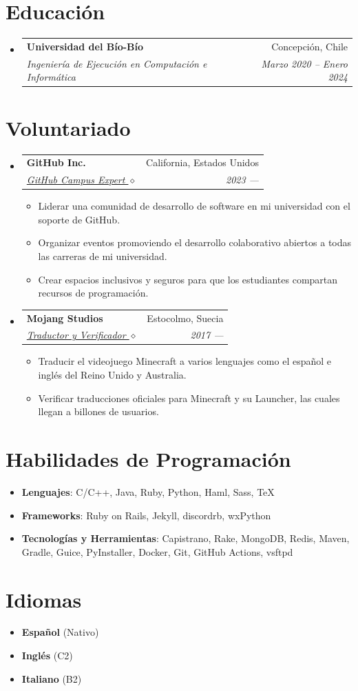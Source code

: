 \documentclass[letterpaper,11pt]{article}
\makeatletter
\newcommand{\resumeSubheading}[4]{
  \vspace{-1pt}\item
    \begin{tabular*}{0.97\textwidth}[t]{l@{\extracolsep{\fill}}r}
      \textbf{#1} & #2 \\
      \textit{\small#3} & \textit{\small #4} \\
    \end{tabular*}\vspace{-5pt}
}
\newcommand{\resumeSubHeadingListStart}{\begin{itemize}[leftmargin=*]}
\newcommand{\resumeSubHeadingListEnd}{\end{itemize}}
\newcommand{\resumeItemListStart}{\begin{itemize}}
\newcommand{\resumeItemListEnd}{\end{itemize}\vspace{-5pt}}
\makeatother
\begin{document}
  \section{Educación}
  \resumeSubHeadingListStart
    \resumeSubheading
      {Universidad del Bío-Bío}{Concepción, Chile}
      {Ingeniería de Ejecución en Computación e Informática}{Marzo 2020 -- Enero 2024}
  \resumeSubHeadingListEnd
  
\section{Voluntariado}
  \resumeSubHeadingListStart
    \resumeSubheading
    {GitHub Inc.}{California, Estados Unidos}
    {\href{https://githubcampus.expert/BGMP}{GitHub Campus Expert $\diamond$}}{2023 ---}
    \resumeItemListStart
      \item{Liderar una comunidad de desarrollo de software en mi universidad con el soporte de GitHub.}
      \item{Organizar eventos promoviendo el desarrollo colaborativo abiertos a todas las carreras de mi universidad.}
      \item{Crear espacios inclusivos y seguros para que los estudiantes compartan recursos de programación.}
    \resumeItemListEnd
    \resumeSubheading
    {Mojang Studios}{Estocolmo, Suecia}
    {\href{https://crowdin.com/profile/bgm}{Traductor y Verificador $\diamond$}}{2017 ---}
    \resumeItemListStart
      \item{Traducir el videojuego Minecraft a varios lenguajes como el español e inglés del Reino Unido y Australia.}
      \item{Verificar traducciones oficiales para Minecraft y su Launcher, las cuales llegan a billones de usuarios.}
    \resumeItemListEnd
    \resumeSubHeadingListEnd

\section{Habilidades de Programación}
  \resumeSubHeadingListStart
    \item{
      \textbf{Lenguajes}{: C/C++, Java, Ruby, Python, Haml, Sass, TeX}
    }
    \item{
      \textbf{Frameworks}{: Ruby on Rails, Jekyll, discordrb, wxPython}
    }
    \item{
      \textbf{Tecnologías y Herramientas}{: Capistrano, Rake, MongoDB, Redis, Maven, Gradle, Guice, PyInstaller, Docker, Git, GitHub Actions, vsftpd}
    }
  \resumeSubHeadingListEnd

\section{Idiomas}
\resumeSubHeadingListStart
\item{
  \textbf{Español}{ (Nativo)}
}
\item{
  \textbf{Inglés}{ (C2)}
}
\item{
  \textbf{Italiano}{ (B2)}
}
\resumeSubHeadingListEnd

\end{document}
